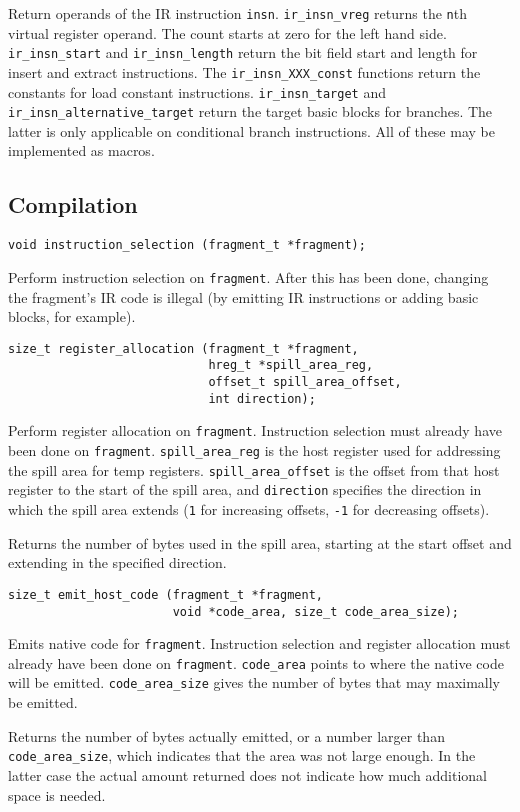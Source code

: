 \documentclass{article}
\newcommand{\cc}[1]{\texttt{#1}} %
\begin{document}
Return operands of the IR instruction \cc{insn}.  \cc{ir\_insn\_vreg}
returns the \cc{n}th virtual register operand.  The count starts at
zero for the left hand side.  \cc{ir\_insn\_start} and
\cc{ir\_insn\_length} return the bit field start and length for
insert and extract instructions.  The \cc{ir\_insn\_XXX\_const}
functions return the constants for load constant instructions.
\cc{ir\_insn\_target} and \cc{ir\_insn\_alternative\_target} return
the target basic blocks for branches.  The latter is only applicable
on conditional branch instructions.  All of these may be implemented
as macros.

\subsection{Compilation}

\begin{verbatim}
void instruction_selection (fragment_t *fragment);
\end{verbatim}

Perform instruction selection on \cc{fragment}.  After this has been
done, changing the fragment's IR code is illegal (by emitting IR
instructions or adding basic blocks, for example).

\begin{verbatim}
size_t register_allocation (fragment_t *fragment,
                            hreg_t *spill_area_reg,
                            offset_t spill_area_offset,
                            int direction);
\end{verbatim}

Perform register allocation on \cc{fragment}.  Instruction selection
must already have been done on \cc{fragment}.  \cc{spill\_area\_reg}
is the host register used for addressing the spill area for temp
registers.  \cc{spill\_area\_offset} is the offset from that host
register to the start of the spill area, and \cc{direction} specifies
the direction in which the spill area extends (\cc{1} for increasing
offsets, \cc{-1} for decreasing offsets).

Returns the number of bytes used in the spill area, starting at the
start offset and extending in the specified direction.

\begin{verbatim}
size_t emit_host_code (fragment_t *fragment,
                       void *code_area, size_t code_area_size);
\end{verbatim}

Emits native code for \cc{fragment}.  Instruction selection and
register allocation must already have been done on \cc{fragment}.
\cc{code\_area} points to where the native code will be emitted.
\cc{code\_area\_size} gives the number of bytes that may maximally
be emitted.

Returns the number of bytes actually emitted, or a number larger than
\cc{code\_area\_size}, which indicates that the area was not large
enough.  In the latter case the actual amount returned does not
indicate how much additional space is needed.

\begingroup
\setlength{\parindent}{0pt}\setlength{\parskip}{2ex}
\renewcommand{\enotesize}{\normalsize}
\theendnotes\endgroup
\end{document}
